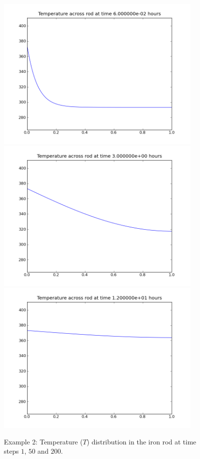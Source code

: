 \begin{figure}
\begin{center}
\includegraphics[width=4in]{figures/rodpyplot001}
\includegraphics[width=4in]{figures/rodpyplot050}
\includegraphics[width=4in]{figures/rodpyplot200}
\caption{Example 2: Temperature ($T$) distribution in the iron rod at time steps
$1$, $50$ and $200$.}
\label{fig:onedheatout 002} 
\end{center}
\end{figure}

